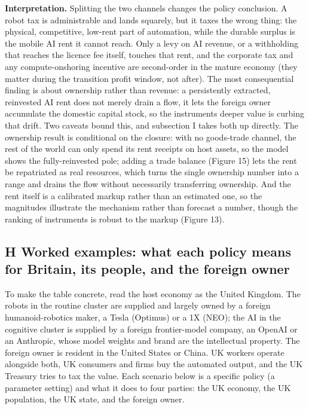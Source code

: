 \documentclass[11pt]{article}
\begin{document}
\textbf{Interpretation.} Splitting the two channels changes the policy
conclusion. A robot tax is administrable and lands squarely, but it
taxes the wrong thing: the physical, competitive, low-rent part of
automation, while the durable surplus is the mobile AI rent it cannot
reach. Only a levy on AI revenue, or a withholding that reaches the
licence fee itself, touches that rent, and the corporate tax and any
compute-onshoring incentive are second-order in the mature economy (they
matter during the transition profit window, not after). The most
consequential finding is about ownership rather than revenue: a
persistently extracted, reinvested AI rent does not merely drain a flow,
it lets the foreign owner accumulate the domestic capital stock, so the
instruments\textquotesingle{} deeper value is curbing that drift. Two
caveats bound this, and subsection I takes both up directly. The
ownership result is conditional on the closure: with no goods-trade
channel, the rest of the world can only spend its rent receipts on host
assets, so the model shows the fully-reinvested pole; adding a trade
balance (Figure 15) lets the rent be repatriated as real resources,
which turns the single ownership number into a range and drains the flow
without necessarily transferring ownership. And the rent itself is a
calibrated markup rather than an estimated one, so the magnitudes
illustrate the mechanism rather than forecast a number, though the
ranking of instruments is robust to the markup (Figure 13).

\hypertarget{h-worked-examples-what-each-policy-means-for-britain-its-people-and-the-foreign-owner}{%
\subsection{H \textperiodcentered{} Worked examples: what each policy means for Britain, its
people, and the foreign
owner}\label{h-worked-examples-what-each-policy-means-for-britain-its-people-and-the-foreign-owner}}

To make the table concrete, read the host economy as the United Kingdom.
The robots in the routine cluster are supplied and largely owned by a
foreign humanoid-robotics maker, a Tesla (Optimus) or a 1X (NEO); the AI
in the cognitive cluster is supplied by a foreign frontier-model
company, an OpenAI or an Anthropic, whose model weights and brand are
the intellectual property. The foreign owner is resident in the United
States or China. UK workers operate alongside both, UK consumers and
firms buy the automated output, and the UK Treasury tries to tax the
value. Each scenario below is a specific policy (a parameter setting)
and what it does to four parties: the UK economy, the UK population, the
UK state, and the foreign owner.
\end{document}
